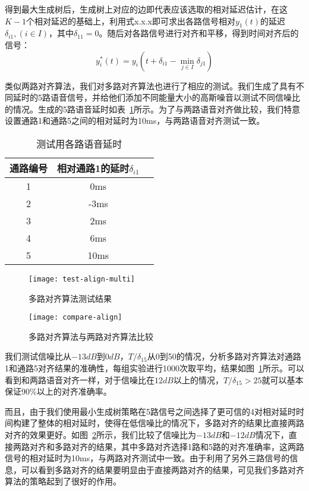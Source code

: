 得到最大生成树后，生成树上对应的边即代表应该选取的相对延迟估计，在这$K-1$个相对延迟的基础上，利用式x.x.x即可求出各路信号相对$y_1 (t)$的延迟$\delta_{i1},(i \in I)$，其中$\delta_{11}=0$。随后对各路信号进行对齐和平移，得到时间对齐后的信号：
\begin{equation}
y_i^* (t)=y_i (t+\delta_{i1}-\min_{j\in I}\delta_{j1})
\end{equation}

类似两路对齐算法，我们对多路对齐算法也进行了相应的测试。我们生成了具有不同延时的5路语音信号，并给他们添加不同能量大小的高斯噪音以测试不同信噪比的情况。生成的5路语音延时如表~\ref{tab:delays}所示。为了与两路语音对齐做比较，我们特意设置通路1和通路5之间的相对延时为10ms，与两路语音对齐测试一致。

\begin{table}
\centering
\caption{测试用各路语音延时}
\label{tab:delays}
\begin{tabular}{ccc}
\toprule[1.5pt]
通路编号 & 相对通路1的延时$\delta_{i1}$ \\ \midrule[1pt]
1 & 0ms \\
2 & -3ms \\
3 & 2ms \\
4 & 6ms \\
5 & 10ms \\
\end{tabular}
\end{table}

\begin{figure}
\centering
\texttt{[image: test-align-multi]}
\caption{多路对齐算法测试结果\label{fig:test-align-multi}}
\end{figure}

\begin{figure}
\centering
\texttt{[image: compare-align]}
\caption{多路对齐算法与两路对齐算法比较\label{fig:compare-align}}
\end{figure}

我们测试信噪比从$-13dB$到$0dB$，$T/\delta_{15}$从0到50的情况，分析多路对齐算法对通路1和通路5对齐结果的准确性，每组实验进行1000次取平均，结果如图~\ref{fig:test-align-multi}所示。可以看到和两路语音对齐一样，对于信噪比在$12dB$以上的情况，$T/\delta_{15} > 25$就可以基本保证90\%以上的对齐准确率。

而且，由于我们使用最小生成树策略在5路信号之间选择了更可信的4对相对延时时间构建了整体的相对延时，使得在低信噪比的情况下，多路对齐的结果比直接两路对齐的效果更好。如图~\ref{fig:compare-align}所示，我们比较了信噪比为$-13dB$和$-12dB$情况下，直接两路对齐和多路对齐的结果，其中多路对齐选择1路和5路的对齐准确率，这两路信号的相对延时为10ms，与两路对齐测试中一致。由于利用了另外三路信号的信息，可以看到多路对齐的结果要明显由于直接两路对齐的结果，可见我们多路对齐算法的策略起到了很好的作用。

